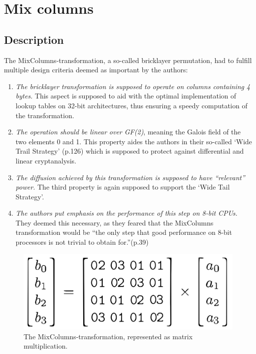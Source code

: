 \hypertarget{mix-columns}{%
\section{Mix columns}\label{mix-columns}}

\hypertarget{description-4}{%
\subsection{Description}\label{description-4}}

The MixColumns-transformation, a so-called bricklayer permutation, had to fulfill
\cite[p.39]{rijndael} multiple design criteria deemed as important by the authors:

\begin{enumerate}
\def\labelenumi{\arabic{enumi}.}

\item
  \emph{The bricklayer transformation is supposed to operate on columns
  containing 4 bytes.} This aspect is supposed to aid with the optimal
  implementation of lookup tables on 32-bit architectures, thus
  ensuring a speedy computation of the transformation.
\item
  \emph{The operation should be linear over GF(2)}, meaning the Galois
  field of the two elements 0 and 1. This property aides the authors in
  their so-called `Wide Trail Strategy' (p.126) which is supposed to
  protect against differential and linear cryptanalysis.
\item
  \emph{The diffusion achieved by this transformation is supposed to
  have ``relevant'' power.} The third property is again supposed to
  support the `Wide Tail Strategy'.
\item
  \emph{The authors put emphasis on the performance of this step on 8-bit
  CPUs.} They deemed this necessary, as they feared that the MixColumns
  transformation would be ``the only step that good performance on 8-bit
  processors is not trivial to obtain for.''(p.39)
\end{enumerate}


\begin{figure}
\centering
\includegraphics[scale = 0.2]{data/figures/mixcolumn.png}
\caption{The MixColumns-transformation, represented as matrix multiplication.\cite[p. 40]{rijndael}}
\label{fig:mixcolumn}
\end{figure}

